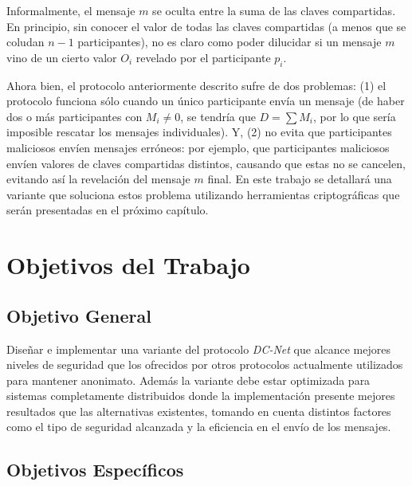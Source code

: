 Informalmente, el mensaje $m$ se oculta entre la suma de las claves 
compartidas. En principio, sin conocer el valor de todas las claves compartidas (a 
menos que se coludan $n-1$ participantes), no es claro como poder dilucidar si 
un mensaje $m$ vino de un cierto valor $O_i$ revelado por el participante $p_i$.

Ahora bien, el protocolo anteriormente descrito sufre de dos problemas: (1) el 
protocolo funciona sólo cuando un único participante envía un mensaje (de 
haber dos o más participantes con $M_i \neq 0$, se tendría que $D = \sum M_i$, 
por lo que sería imposible rescatar los mensajes individuales). Y, (2) no 
evita que participantes maliciosos envíen mensajes erróneos: por ejemplo, que 
participantes maliciosos envíen valores de claves compartidas distintos, 
causando que estas no se cancelen, evitando así la revelación del mensaje $m$ 
final. En este trabajo se detallará una variante que soluciona estos problema 
utilizando herramientas criptográficas que serán presentadas en el próximo 
capítulo.

\section{Objetivos del Trabajo}

\subsection{Objetivo General}

Diseñar e implementar una variante del protocolo \emph{DC-Net} que alcance 
mejores niveles de seguridad que los ofrecidos por otros protocolos 
actualmente utilizados para mantener anonimato. Además la variante debe estar 
optimizada para sistemas completamente distribuidos donde la implementación 
presente mejores resultados que las alternativas existentes, tomando en cuenta 
distintos factores como el tipo de seguridad alcanzada y la eficiencia en el 
envío de los mensajes.

\subsection{Objetivos Específicos}

